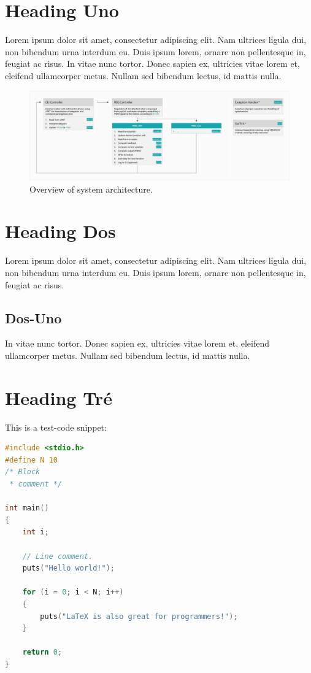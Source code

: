 \section{Heading Uno}
Lorem ipsum dolor sit amet, consectetur adipiscing elit. Nam ultrices ligula dui, non bibendum urna interdum eu. Duis ipsum lorem, ornare non pellentesque in, feugiat ac risus. In vitae nunc tortor. Donec sapien ex, ultricies vitae lorem et, eleifend ullamcorper metus. Nullam sed bibendum lectus, id mattis nulla.\medskip

\begin{figure}[H]
    \centering
    \includegraphics[width=\textwidth]{assets/img/mcu_architecture.jpg}
    \caption{Overview of system architecture.}
    \label{fig:mcu_architecture}
\end{figure}

\section{Heading Dos}
Lorem ipsum dolor sit amet, consectetur adipiscing elit. Nam ultrices ligula dui, non bibendum urna interdum eu. Duis ipsum lorem, ornare non pellentesque in, feugiat ac risus.

\subsection{Dos-Uno}
In vitae nunc tortor. Donec sapien ex, ultricies vitae lorem et, eleifend ullamcorper metus. Nullam sed bibendum lectus, id mattis nulla.

\newpage
\section{Heading Tré}
This is a test-code snippet:\medskip

\begin{lstlisting}[language=C]
#include <stdio.h>
#define N 10
/* Block
 * comment */

int main()
{
    int i;

    // Line comment.
    puts("Hello world!");
    
    for (i = 0; i < N; i++)
    {
        puts("LaTeX is also great for programmers!");
    }

    return 0;
}
\end{lstlisting}\medskip

